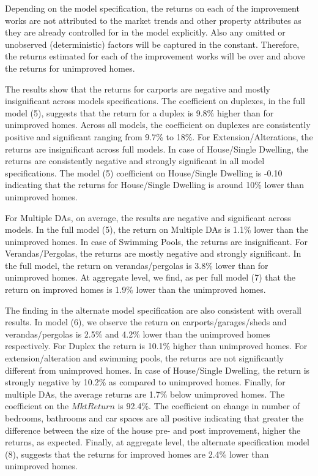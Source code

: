 \documentclass[AEJ,reqno, draftmode]{AEA} %
\begin{document}
Depending on the model specification, the returns on each of the improvement works are not attributed to the market trends and other property attributes as they are already controlled for in the model explicitly. Also any omitted or unobserved (deterministic) factors will be captured in the constant. Therefore, the returns estimated for each of the improvement works will be over and above the returns for unimproved homes. 


The results show that the returns for carports are negative and mostly insignificant across models specifications. The coefficient on duplexes, in the full model (5), suggests that the return for a duplex is 9.8\% higher than for unimproved homes. Across all models, the coefficient on duplexes are consistently positive and significant ranging from 9.7\% to 18\%. For Extension/Alterations, the returns are insignificant across full models. In case of House/Single Dwelling, the returns are consistently negative and strongly significant in all model specifications. The model (5) coefficient on House/Single Dwelling is -0.10 indicating that the returns for House/Single Dwelling is around 10\% lower than unimproved homes. 


\restoregeometry

For Multiple DAs, on average, the results are negative and significant across models. In the full model (5), the return on Multiple DAs is 1.1\% lower than the unimproved homes. In case of Swimming Pools, the returns are insignificant. For Verandas/Pergolas, the returns are mostly negative and strongly significant. In the full model, the return on verandas/pergolas is 3.8\% lower than for unimproved homes. At aggregate level, we find, as per full model (7) that the return on improved homes is 1.9\% lower than the unimproved homes.

The finding in the alternate model specification are also consistent with overall results. In model (6), we observe the return on carports/garages/sheds and verandas/pergolas is 2.5\% and 4.2\% lower than the unimproved homes respectively. For Duplex the return is 10.1\% higher than unimproved homes. For extension/alteration and swimming pools, the returns are not significantly different from unimproved homes. In case of House/Single Dwelling, the return is strongly negative by 10.2\% as compared to unimproved homes. Finally, for multiple DAs, the average returns are 1.7\% below unimproved homes. The coefficient on the $MktReturn$ is 92.4\%. The coefficient on change in number of bedrooms, bathrooms and car spaces are all positive indicating that greater the difference between the size of the house pre- and post improvement, higher the returns, as expected. Finally, at aggregate level, the alternate specification model (8), suggests that the returns for improved homes are 2.4\% lower than unimproved homes.
\end{document}
